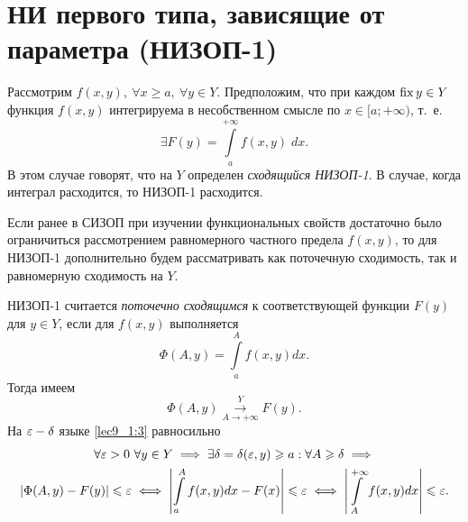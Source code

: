 \documentclass[../../main.tex]{subfiles}
\begin{document}
\section{НИ первого типа, зависящие от параметра (\mbox{НИЗОП-1})}

Рассмотрим $ f(x, y),\ \forall x \geq a,\ \forall y \in Y $.
Предположим, что при каждом $ \operatorname{fix} y \in Y $ функция $ f(x, y) $
интегрируема в несобственном смысле по $ x \in [a; +\infty) $, т.~е.
\begin{equation}
\label{lec9_1:1}
\exists F(y) = \int\limits_a^{+\infty} f(x, y)\; dx.
\end{equation}
В этом случае говорят, что на $ Y $ определен \emph{сходящийся НИЗОП-1}.
В случае, когда интеграл расходится, то НИЗОП-1 расходится.

Если ранее в СИЗОП при изучении функциональных свойств достаточно
было ограничиться рассмотрением равномерного частного предела $ f(x, y) $,
то для НИЗОП-1 дополнительно будем рассматривать как поточечную сходимость,
так и равномерную сходимость на $ Y $.

НИЗОП-1 считается \emph{поточечно сходящимся} к соответствующей функции $ F(y) 
$
для ${y \in Y}$, если для $ f(x, y) $ выполняется
\begin{equation}
\label{lec9_1:2}
\Phi(A, y) = \int\limits_a^A f(x, y) dx.
\end{equation}
Тогда имеем
\begin{equation}
\label{lec9_1:3}
\Phi(A, y) \stackrel{Y}{\underset{A \to +\infty}{\to}} F(y).
\end{equation}
На $ \varepsilon-\delta $ языке \eqref{lec9_1:3} равносильно
\begin{equation}
\label{lec9_1:4}
\begin{gathered}
\forall \varepsilon > 0\ \forall y \in Y \implies \exists \delta = \delta(\varepsilon, y)
\geqslant a:\forall A \geqslant \delta \implies\\ 
|\Phi(A, y) - F(y)| \leqslant \varepsilon \iff
\left|\int\limits_a^A f(x, y) dx - F(x)\right| \leqslant \varepsilon \iff
\left|\int\limits_A^{+\infty} f(x, y) dx\right| \leqslant \varepsilon.
\end{gathered}
\end{equation}
\end{document}
